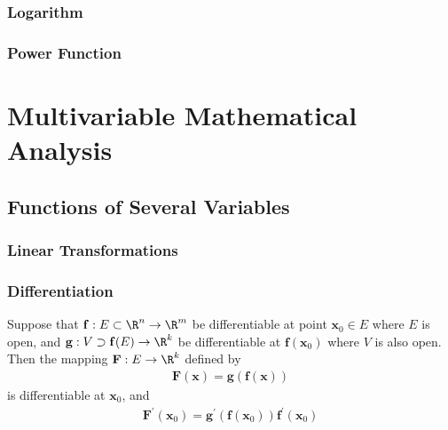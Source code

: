 \documentclass[thmcnt=section, 12pt]{elegantbook}
\begin{document}

\section{Logarithm}


\section{Power Function}


















\part{Multivariable Mathematical Analysis}



\chapter{Functions of Several Variables}


\section{Linear Transformations}


\section{Differentiation}


\begin{theorem} \label{thm:20}
    Suppose that $\mathbf{f}: E \subset \R^n \to \R^m$ be differentiable at point $\mathbf{x}_0 \in E$ where $E$ is open, and $\mathbf{g}: V \supset \mathbf{f}(E) \to \R^k$ be differentiable at $\mathbf{f}(\mathbf{x}_0)$ where $V$ is also open. Then the mapping $\mathbf{F}: E \to \R^k$ defined by 
    \begin{align*}
        \mathbf{F}(\mathbf{x}) = \mathbf{g}(\mathbf{f}(\mathbf{x}))
    \end{align*}
    is differentiable at $\mathbf{x}_0$, and 
    \begin{align*}
        \mathbf{F}^\prime(\mathbf{x}_0)
        = \mathbf{g}^\prime(\mathbf{f}(\mathbf{x}_0)) \mathbf{f}^\prime(\mathbf{x}_0)
    \end{align*}
\end{theorem}
\end{document}
